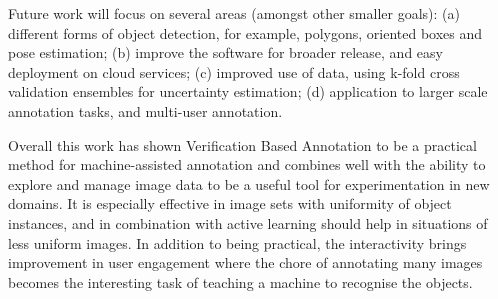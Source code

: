 Future work will focus on several areas (amongst other smaller goals): (a) different forms of object detection, for example, polygons, oriented boxes and pose estimation; (b) improve the software for broader release, and easy deployment on cloud services; (c) improved use of data, using k-fold cross validation ensembles for uncertainty estimation; (d) application to larger scale annotation tasks, and multi-user annotation.

Overall this work has shown Verification Based Annotation to be a practical method for machine-assisted annotation and combines well with the ability to explore and manage image data to be a useful tool for experimentation in new domains. It is especially effective in image sets with uniformity of object instances, and in combination with active learning should help in situations of less uniform images. In addition to being practical, the interactivity brings improvement in user engagement where the chore of annotating many images becomes the interesting task of teaching a machine to recognise the objects.
